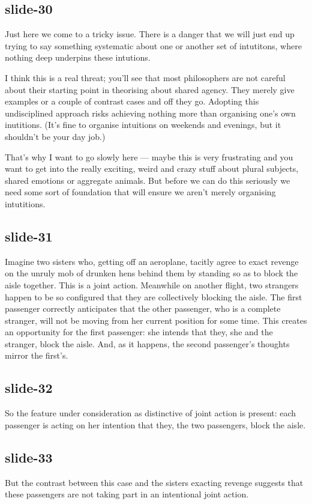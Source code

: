 \documentclass[12pt,\papersize]{extarticle}
\begin{document}
\subsection{slide-30}
Just here we come to a tricky issue.
There is a danger that we will just end up trying to say something systematic
about one or another set of intutitons, where nothing deep underpins these intutions.

I think this is a real threat; you’ll see that most philosophers are not careful
about their starting point in theorising about shared agency.  They merely give
examples or a couple of contrast cases and off they go.
Adopting this undisciplined approach risks achieving nothing more than
organising one’s own inutitions.  (It’s fine to organise intuitions on weekends and evenings,
but it shouldn’t be your day job.)

That’s why I want to go slowly here --- maybe this is very frustrating and you want to get
into the really exciting, weird and crazy stuff about plural subjects, shared emotions
or aggregate animals.  But before we can do this seriously we need some sort of foundation
that will ensure we aren’t merely organising intutitions.

\subsection{slide-31}
Imagine two sisters who, getting off an aeroplane, tacitly agree to exact revenge on
the unruly mob of drunken hens behind them by standing so as to block the aisle together.
This is a joint action.
Meanwhile on another flight, two strangers happen to be so configured that they are
collectively blocking the aisle.
The first passenger correctly anticipates that the other passenger, who is a
complete stranger, will not be moving from her current position for some time.
This creates an opportunity for the first passenger: she intends that they,
she and the stranger, block the aisle.
And, as it happens, the second passenger’s thoughts mirror the first’s.

\subsection{slide-32}
So the feature under consideration as distinctive of joint action is present:
each passenger is acting on her intention that they, the two passengers, block the aisle.

\subsection{slide-33}
But the contrast between this case and the sisters exacting revenge suggests
that these passengers are not taking part in an intentional joint action.
\end{document}
